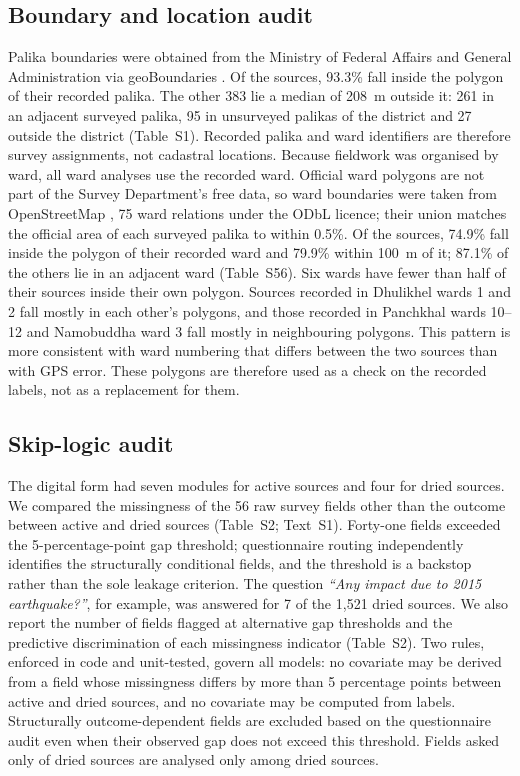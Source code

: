 \documentclass[preprint,12pt,authoryear]{elsarticle}
\begin{document}
\subsection{Boundary and location audit}
Palika boundaries were obtained from the Ministry of Federal Affairs and General Administration via geoBoundaries \citep{runfola2020geoboundaries}. Of the sources, 93.3\% fall inside the polygon of their recorded palika. The other 383 lie a median of \SI{208}{\metre} outside it: 261 in an adjacent surveyed palika, 95 in unsurveyed palikas of the district and 27 outside the district (Table~S1). Recorded palika and ward identifiers are therefore survey assignments, not cadastral locations. Because fieldwork was organised by ward, all ward analyses use the recorded ward. Official ward polygons are not part of the Survey Department's free data, so ward boundaries were taken from OpenStreetMap \citep{osm2026wards}, 75 ward relations under the ODbL licence; their union matches the official area of each surveyed palika to within 0.5\%. Of the sources, 74.9\% fall inside the polygon of their recorded ward and 79.9\% within \SI{100}{\metre} of it; 87.1\% of the others lie in an adjacent ward (Table~S56). Six wards have fewer than half of their sources inside their own polygon. Sources recorded in Dhulikhel wards 1 and 2 fall mostly in each other's polygons, and those recorded in Panchkhal wards 10--12 and Namobuddha ward 3 fall mostly in neighbouring polygons. This pattern is more consistent with ward numbering that differs between the two sources than with GPS error. These polygons are therefore used as a check on the recorded labels, not as a replacement for them.

\subsection{Skip-logic audit}
The digital form had seven modules for active sources and four for dried sources. We compared the missingness of the 56 raw survey fields other than the outcome between active and dried sources (Table~S2; Text~S1). Forty-one fields exceeded the 5-percentage-point gap threshold; questionnaire routing independently identifies the structurally conditional fields, and the threshold is a backstop rather than the sole leakage criterion. The question \emph{``Any impact due to 2015 earthquake?''}, for example, was answered for 7 of the 1,521 dried sources. We also report the number of fields flagged at alternative gap thresholds and the predictive discrimination of each missingness indicator (Table~S2). Two rules, enforced in code and unit-tested, govern all models: no covariate may be derived from a field whose missingness differs by more than 5 percentage points between active and dried sources, and no covariate may be computed from labels. Structurally outcome-dependent fields are excluded based on the questionnaire audit even when their observed gap does not exceed this threshold. Fields asked only of dried sources are analysed only among dried sources.
\end{document}
